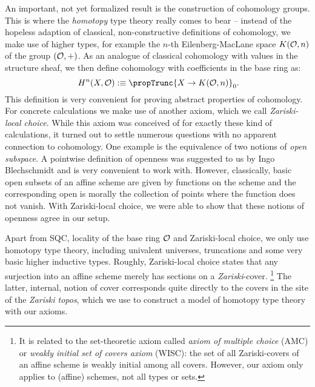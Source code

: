 An important, not yet formalized result
is the construction of cohomology groups.
This is where the \emph{homotopy} type theory really comes to bear --
instead of the hopeless adaption of classical, non-constructive definitions of cohomology,
we make use of higher types,
for example the $n$-th Eilenberg-MacLane space $K(\mathcal O,n)$ of the group $(\mathcal O,+)$.
As an analogue of classical cohomology with values in the structure sheaf,
we then define cohomology with coefficients in the base ring as:
\[
  H^n(X,\A):\equiv \propTrunc{X\to K(\A,n)}_0
  \rlap{.}
\]
This definition is very convenient for proving abstract properties of cohomology.
For concrete calculations we make use of another axiom,
which we call \emph{Zariski-local choice}.
While this axiom was conceived of for exactly these kind of calculations,
it turned out to settle numerous questions with no apparent connection to cohomology.
One example is the equivalence of two notions of \emph{open subspace}.
A pointwise definition of openness was suggested to us by Ingo Blechschmidt and
is very convenient to work with.
However, classically, basic open subsets of an affine scheme are given
by functions on the scheme and the corresponding open is morally the collection of points where the function does not vanish.
With Zariski-local choice, we were able to show that these notions of openness agree in our setup.

Apart from SQC, locality of the base ring $\mathcal O$ and Zariski-local choice,
we only use homotopy type theory, including univalent universes, truncations and some very basic higher inductive types.
Roughly, Zariski-local choice states that any surjection into an affine scheme merely has sections on a \emph{Zariski}-cover.%
\footnote{It is related to the set-theoretic axiom called
\emph{axiom of multiple choice} (AMC) \cite{vandenberg-moerdijk-amc} or \emph{weakly initial set of covers axiom} (WISC):
the set of all Zariski-covers of an affine scheme is weakly initial among all covers.
However, our axiom only applies to (affine) schemes, not all types or sets.}
The latter, internal, notion of cover corresponds quite directly to the covers in the site of the \emph{Zariski topos},
which we use to construct a model of homotopy type theory with our axioms.

